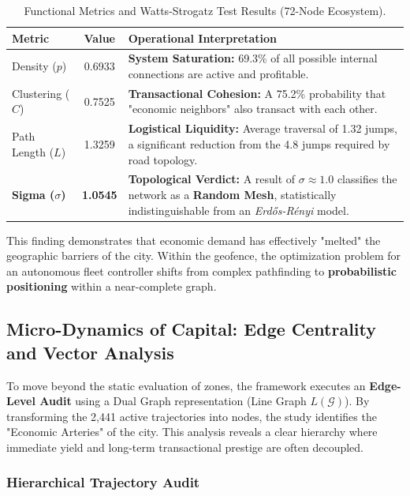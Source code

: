 \begin{table}[H]
    \centering
    \small
    \begin{tabularx}{\textwidth}{l c X}
        \toprule
        \textbf{Metric} & \textbf{Value} & \textbf{Operational Interpretation} \\
        \midrule
        Density ($p$) & 0.6933 & \textbf{System Saturation:} 69.3\% of all possible internal connections are active and profitable. \\
        \addlinespace
        Clustering ($C$) & 0.7525 & \textbf{Transactional Cohesion:} A 75.2\% probability that "economic neighbors" also transact with each other. \\
        \addlinespace
        Path Length ($L$) & 1.3259 & \textbf{Logistical Liquidity:} Average traversal of 1.32 jumps, a significant reduction from the 4.8 jumps required by road topology. \\
        \addlinespace
        \textbf{Sigma ($\sigma$)} & \textbf{1.0545} & \textbf{Topological Verdict:} A result of $\sigma \approx 1.0$ classifies the network as a \textbf{Random Mesh}, statistically indistinguishable from an \textit{Erdős-Rényi} model. \\
        \bottomrule
    \end{tabularx}
    \caption{Functional Metrics and Watts-Strogatz Test Results (72-Node Ecosystem).}
    \label{tab:functional_metrics}
\end{table}

This finding demonstrates that economic demand has effectively "melted" the geographic barriers of the city. Within the geofence, the optimization problem for an autonomous fleet controller shifts from complex pathfinding to \textbf{probabilistic positioning} within a near-complete graph.


\subsection{Micro-Dynamics of Capital: Edge Centrality and Vector Analysis}

To move beyond the static evaluation of zones, the framework executes an \textbf{Edge-Level Audit} using a Dual Graph representation (Line Graph $L(\mathcal{G})$). By transforming the 2,441 active trajectories into nodes, the study identifies the "Economic Arteries" of the city. This analysis reveals a clear hierarchy where immediate yield and long-term transactional prestige are often decoupled.

\subsubsection{Hierarchical Trajectory Audit}

